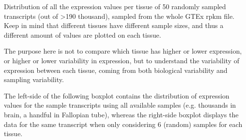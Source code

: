 \documentclass{article}\usepackage[]{graphicx}\usepackage[]{color}
\begin{document}
Distribution of all the expression values per tissue of 50 randomly sampled transcripts (out of >190 thousand), sampled from the whole GTEx rpkm file. Keep in mind that different tissues have different sample sizes, and thus a different amount of values are plotted on each tissue. \par 
The purpose here is not to compare which tissue has higher or lower expression, or higher or lower variability in expression, but to understand the variability of expression between each tissue, coming from both biological variability and sampling variability. \par
The left-side of the following boxplot contains the distribution of expression values for the sample transcripts using all available samples (e.g. thousands in brain, a handful in Fallopian tube), whereas the right-side boxplot displays the data for the same transcript when only considering 6 (random) samples for each tissue.
\end{document}
